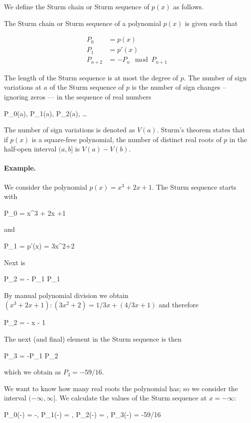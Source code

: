 We define the Sturm chain or Sturm sequence of $p(x)$ as follows.

\begin{definition}
The Sturm chain or Sturm sequence of a polynomial $p(x)$ is given such that

\begin{align}
P_0 &= p(x) \\
P_1 &= p'(x) \\
P_{n+2} &= - P_n \mod P_{n+1}
\end{align}

\end{definition}

The length of the Sturm sequence is at most the degree of $p$. The number of sign variations at $a$ of the Sturm sequence of $p$ is the number of sign changes – ignoring zeros — in the sequence of real numbers

\bee
P_0(a), P_1(a), P_2(a), \ldots 
\eee

The  number of sign variations is denoted as $V(a)$. Sturm's theorem states that if $p(x)$ is a square-free polynomial, the number of distinct real roots of $p$ in the half-open interval $(a, b]$ is $V(a) - V(b)$.

\paragraph{Example.} We consider the polynomial $p(x) = x^3 + 2x +1$. The Sturm sequence starts with 

\bee
P_0 = x^3 + 2x +1
\eee

and

\bee
P_1 = p'(x) = 3x^2+2
\eee

Next is

\bee
P_2 = - P_1 \mod P_1
\eee

By manual polynomial division we obtain $(x^3 + 2x + 1):(3x^2+2) = 1/3 x + \left(4/3x + 1 \right)$ and therefore

\bee
P_2 = - x - 1
\eee

The next (and final) element in the Sturm sequence is then

\bee
P_3 = -P_1 \mod P_2
\eee

which we obtain as $P_3 = - 59/16$.

We want to know how many real roots the polynomial has; so we consider the interval $(-\infty, \infty]$. We calculate the values of the Sturm sequence at $x = -\infty$:

\bee
P_0(-\infty) = -\infty, P_1(-\infty) = \infty, P_2(-\infty) = \infty, P_3(-\infty) = -59/16
\eee

